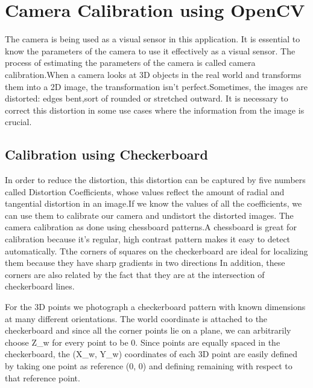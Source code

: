 %
%


\chapter{Camera Calibration using OpenCV}

The camera is being used as a visual sensor in this application. It is essential to know the parameters of the camera to use it effectively as a visual sensor.
The process of estimating the parameters of the camera is called camera calibration.When a camera looks at 3D objects in the real world and transforms them into a 2D image, the transformation isn’t perfect.Sometimes, the images are distorted: edges bent,sort of rounded or stretched outward. It is necessary to correct this distortion in some use cases where the information from the image is crucial.

\section{Calibration using Checkerboard}

In order to reduce the distortion, this distortion can be captured by five numbers called Distortion Coefficients, whose values reflect the amount of radial and tangential distortion in an image.If we know the values of all the coefficients, we can use them to calibrate our camera and undistort the distorted images.
The camera calibration as done using chessboard patterns.A chessboard is great for calibration because it's regular, high contrast pattern makes it easy to detect automatically. Tthe corners of squares on the checkerboard are ideal for localizing them because they have sharp gradients in two directions
In addition, these corners are also related by the fact that they are at the intersection of checkerboard lines.

For the 3D points we photograph a checkerboard pattern with known dimensions at many different orientations. The world coordinate is attached to the checkerboard and since all the corner points lie on a plane, we can arbitrarily choose Z{\_}w for every point to be 0. Since points are equally spaced in the checkerboard, the (X{\_}w, Y{\_}w) coordinates of each 3D point are easily defined by taking one point as reference (0, 0) and defining remaining with respect to that reference point.

